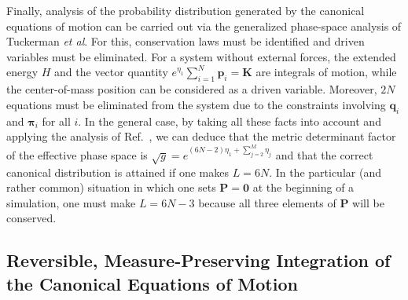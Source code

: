 \documentclass[aip,jcp,reprint,amsmath,amssymb]{revtex4-1}
\newcommand{\vt}[1]{\boldsymbol{\mathbf{#1}}}           %
\begin{document}
Finally, analysis of the probability distribution generated by the canonical equations of motion can be carried out via the generalized phase-space analysis of Tuckerman \textit{et al}.\cite{Tuckerman2001} For this, conservation laws must be identified and driven variables must be eliminated. For a system without external forces, the extended energy $H$ and the vector quantity $e^{\eta_1}\sum_{i=1}^N {\vt p}_i = \vt K$ are integrals of motion, while the center-of-mass position can be considered as a driven variable.\cite{Tuckerman2001} Moreover, $2N$ equations must be eliminated from the system due to the constraints involving $\vt q_i$ and $\vt \pi_i$ for all $i$. In the general case, by taking all these facts into account and applying the analysis of Ref.~, we can deduce that the metric determinant factor of the effective phase space is $\sqrt{g} = e^{(6N-2) \eta_1 + \sum_{j=2}^M \eta_j}$ and that the correct canonical distribution is attained if one makes $L = 6N$. In the particular (and rather common) situation in which one sets $\vt P = \vt 0$ at the beginning of a simulation, one must make $L = 6N - 3$ because all three elements of $\vt P$ will be conserved.\cite{Martyna1994}

\subsection{Reversible, Measure-Preserving Integration of the Canonical Equations of Motion}
\end{document}
